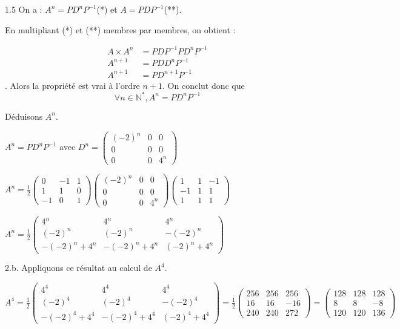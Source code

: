\documentclass[12pt]{article}
\begin{document}
\begin{spacing}{1.5}
On a : $A^n = PD^nP^{-1}$(*) et  $A=PDP^{-1}$(**).

En multipliant (*) et (**) membres par membres, on obtient :

\begin{align*}
A\times A^n &= PDP^{-1}PD^nP^{-1}\\
A^{n+1} &=PDD^nP^{-1}\\
A^{n+1} &=PD^{n+1}P^{-1}
\end{align*}.
Alors la propriété est vrai à l'ordre $n+1$. On conclut donc que \[
\forall {n\in\mathbb{N}^*}, A^n = PD^nP^{-1}
\]

Déduisons $A^n$.

$A^n = PD^nP^{-1}$ avec $D^n=\begin{pmatrix}
(-2)^n & 0& 0 \\ 
0 & 0 & 0 \\ 
0 & 0 & 4^n
\end{pmatrix}$

$A^n=\frac{1}{2}\begin{pmatrix}
0  & -1 & 1 \\ 
1  & 1  & 0 \\ 
-1 & 0  & 1
\end{pmatrix}\begin{pmatrix}
(-2)^n & 0& 0 \\ 
0 & 0 & 0 \\ 
0 & 0 & 4^n
\end{pmatrix}\begin{pmatrix}
1  & 1 & -1 \\ 
-1  & 1  & 1 \\ 
1 & 1  & 1
\end{pmatrix}$

$A^n=\frac{1}{2}\begin{pmatrix}
4^n & 4^n & 4^n \\ 
(-2)^n & (-2)^n & -(-2)^n \\ 
-(-2)^n+4^n & -(-2)^n+4^n & (-2)^n+4^n
\end{pmatrix}$

2.b. Appliquons ce résultat au  calcul de $A^4$. 

$A^4=\frac{1}{2}\begin{pmatrix}
4^4 & 4^4 & 4^4 \\ 
(-2)^4 & (-2)^4 & -(-2)^4 \\ 
-(-2)^4+4^4 & -(-2)^4+4^4 & (-2)^4+4^4
\end{pmatrix}=\frac{1}{2}\begin{pmatrix}
256 & 256 & 256 \\ 
16 & 16 & -16 \\ 
240 & 240 & 272
\end{pmatrix} =\begin{pmatrix}
128 & 128 & 128 \\ 
8 & 8 & -8 \\ 
120 & 120 & 136
\end{pmatrix}$



\end{spacing}
\end{document}
